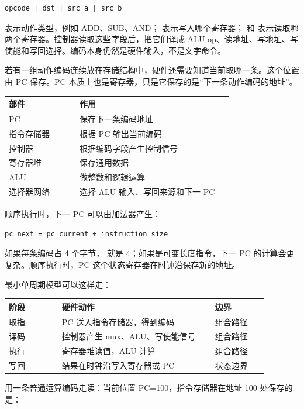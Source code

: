 \begin{lstlisting}
opcode | dst | src_a | src_b
\end{lstlisting}

 表示动作类型，例如 ADD、SUB、AND； 表示写入哪个寄存器； 和  表示读取哪两个寄存器。控制器读取这些字段后，把它们译成 ALU op、读地址、写地址、写使能和写回选择。编码本身仍然是硬件输入，不是文字命令。

若有一组动作编码连续放在存储结构中，硬件还需要知道当前取哪一条。这个位置由 PC 保存。PC 本质上也是寄存器，只是它保存的是“下一条动作编码的地址”。

\begin{longtable}{L{0.24\linewidth}L{0.52\linewidth}}
\toprule
部件 & 作用 \\
\midrule
PC & 保存下一条编码地址 \\
指令存储器 & 根据 PC 输出当前编码 \\
控制器 & 根据编码字段产生控制信号 \\
寄存器堆 & 保存通用数据 \\
ALU & 做整数和逻辑运算 \\
选择器网络 & 选择 ALU 输入、写回来源和下一 PC \\
\bottomrule
\end{longtable}

顺序执行时，下一 PC 可以由加法器产生：

\begin{lstlisting}
pc_next = pc_current + instruction_size
\end{lstlisting}

如果每条编码占 4 个字节， 就是 4；如果是可变长度指令，下一 PC 的计算会更复杂。顺序执行时，PC 这个状态寄存器在时钟沿保存新的地址。

最小单周期模型可以这样走：

\begin{longtable}{L{0.18\linewidth}L{0.52\linewidth}L{0.18\linewidth}}
\toprule
阶段 & 硬件动作 & 边界 \\
\midrule
取指 & PC 送入指令存储器，得到编码 & 组合路径 \\
译码 & 控制器产生 mux、ALU、写使能信号 & 组合路径 \\
执行 & 寄存器堆读值，ALU 计算 & 组合路径 \\
写回 & 结果在时钟沿写入寄存器或 PC & 状态边界 \\
\bottomrule
\end{longtable}

用一条普通运算编码走读：当前位置 PC=100，指令存储器在地址 100 处保存的是：

